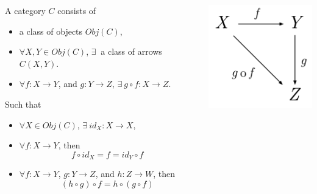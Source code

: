 \documentclass[xcolor={table}]{beamer}
\begin{document}
\begin{frame}{}{}

    \begin{columns}
    
    \begin{definition}
        A category $C$ consists of
        \begin{itemize}
            \item a class of objects $Obj(C)$, 
            \item $\forall X,Y\in Obj(C)$, $\exists\ $ a class of arrows $C(X,Y)$.
            \item $\forall f:X\to Y$, and $g:Y \to Z$, $\exists\ g\circ f:X \to Z$.
        \end{itemize}
        Such that
        \begin{itemize}
            \item $\forall X\in Obj(C)$, $\exists\ id_X: X \to X$,
            \item $\forall f:X\to Y$, then 
                $$ f \circ id_X = f = id_Y \circ f $$
            \item $\forall f:X\to Y$, $g:Y \to Z$, and $h:Z \to W$, then
                $$ (h \circ g) \circ f = h \circ (g \circ f) $$
        \end{itemize}
    \end{definition}


    \includegraphics[width=\textwidth]{images/Commutative_diagram_for_morphism.png}
    \end{columns}

\end{frame}
\end{document}
